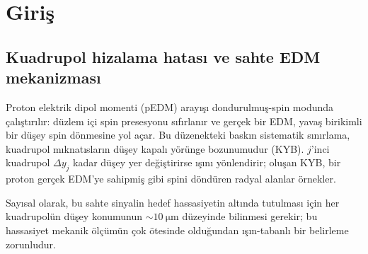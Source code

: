 \documentclass[preprint,12pt]{elsarticle}
\begin{document}
\section{Giriş}
\label{sec:giris}

\subsection{Kuadrupol hizalama hatası ve sahte EDM mekanizması}

Proton elektrik dipol momenti (pEDM) arayışı dondurulmuş-spin modunda
çalıştırılır: düzlem içi spin presesyonu sıfırlanır ve gerçek bir EDM,
yavaş birikimli bir düşey spin dönmesine yol açar. Bu düzenekteki baskın
sistematik sınırlama, kuadrupol mıknatısların düşey kapalı yörünge bozunumudur
(KYB). $j$'inci kuadrupol $\Delta y_j$ kadar düşey yer değiştirirse ışını
yönlendirir; oluşan KYB, bir proton gerçek EDM'ye sahipmiş gibi spini döndüren
radyal alanlar örnekler.

Sayısal olarak, bu sahte sinyalin hedef hassasiyetin altında tutulması için
her kuadrupolün düşey konumunun $\sim\SI{10}{\micro\meter}$ düzeyinde bilinmesi
gerekir; bu hassasiyet mekanik ölçümün çok ötesinde olduğundan ışın-tabanlı
bir belirleme zorunludur.
\end{document}
